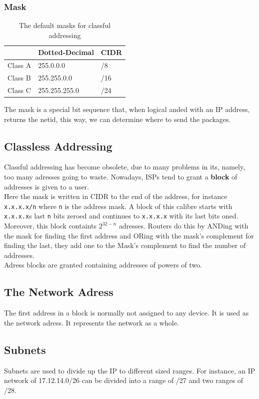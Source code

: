 \documentclass[11pt,a4paper,twoside]{book}
\begin{document}
\subsubsection{Mask}

\begin{table}
\begin{tabular}{lll}
\toprule
& Dotted-Decimal & CIDR \\
\midrule
Class A & 255.0.0.0  & /8\\
Class B & 255.255.0.0 & /16 \\ 
Class C & 255.255.255.0& /24 \\
\bottomrule
\end{tabular}
\caption{The default masks for classful addressing}
\end{table}

The mask is a special bit sequence that, when logical anded with an IP address, returns the netid, this way, we can determine where to send the packages.

\subsection{Classless Addressing}

Classful addressing has become obsolete, due to many problems in its, namely, too many adresses going to waste. Nowadays, ISPs tend to grant a \textbf{block} of addresses is given to a user.\\

Here the mask is written in CIDR to the end of the address, for instance \texttt{x.x.x.x/n} where \texttt{n} is the address mask. A block of this calibre starts with \texttt{x.x.x.x}s last \texttt{n} bits zeroed and continues to \texttt{x.x.x.x} with its last bits oned. Moreover, this block containts $2^{32 - n}$ adresses. Routers do this by ANDing with the mask for finding the first address and ORing with the mask's complement for finding the last, they add one to the Mask's complement to find the number of addresses.\\

Adress blocks are granted containing addresses of powers of two.\\

\subsection{The Network Adress}

The first address in a block is normally not assigned to any device. It is used as the network adress. It represents the network as a whole.

\subsection{Subnets}

Subnets are used to divide up the IP to different sized ranges. For instance, an IP network of 17.12.14.0/26 can be divided into a range of /27 and two ranges of /28.
\end{document}
